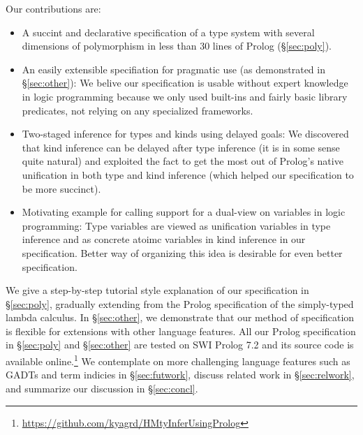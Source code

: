 Our contributions are:
\begin{itemize}\vspace*{-1ex}
\item A succint and declarative specification of
	a type system with several dimensions of polymorphism
	in less than 30 lines of Prolog (\S\ref{sec:poly}).
\item An easily extensible specifiation for pragmatic use
	(as demonstrated in \S\ref{sec:other}):
We belive our specification is usable without expert knowledge
in logic programming because we only used built-ins and fairly basic
library predicates, not relying on any specialized frameworks.
\item Two-staged inference for types and kinds using delayed goals:
We discovered that kind inference can be delayed after type inference
(it is in some sense quite natural) and exploited the fact to get the
most out of Prolog's native unification in both type and kind inference
(which helped our specification to be more succinct).
\item Motivating example for calling support for a dual-view
on variables in logic programming:
	Type variables are viewed as unification variables
	in type inference and as concrete atoimc variables
	in kind inference in our specification.
	Better way of organizing this idea is desirable
	for even better specification.
\end{itemize}

We give a step-by-step tutorial style explanation of our specification in
\S\ref{sec:poly}, gradually extending from the Prolog specification of
the simply-typed lambda calculus. In \S\ref{sec:other}, we demonstrate
that our method of specification is flexible for extensions with
other language features. All our Prolog specification in \S\ref{sec:poly}
and \S\ref{sec:other} are tested on SWI Prolog 7.2 and its source code is
available online.\footnote{
	\url{https://github.com/kyagrd/HMtyInferUsingProlog} }
We contemplate on more challenging language features such as GADTs and
term indicies in \S\ref{sec:futwork}, discuss related work in
\S\ref{sec:relwork}, and summarize our discussion in \S\ref{sec:concl}.




